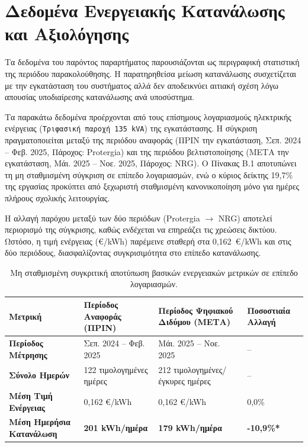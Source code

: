 \chapter{Δεδομένα Ενεργειακής Κατανάλωσης και Αξιολόγησης}

\noindent Τα δεδομένα του παρόντος παραρτήματος παρουσιάζονται ως περιγραφική στατιστική της περιόδου παρακολούθησης. Η παρατηρηθείσα μείωση κατανάλωσης συσχετίζεται με την εγκατάσταση του συστήματος αλλά δεν αποδεικνύει αιτιακή σχέση λόγω απουσίας υποδιαίρεσης κατανάλωσης ανά υποσύστημα.

Τα παρακάτω δεδομένα προέρχονται από τους επίσημους λογαριασμούς ηλεκτρικής ενέργειας (\texttt{Τριφασική παροχή 135 \textlatin{kVA}}) της εγκατάστασης. Η σύγκριση πραγματοποιείται μεταξύ της περιόδου αναφοράς (ΠΡΙΝ την εγκατάσταση, Σεπ. 2024 -- Φεβ. 2025, Πάροχος: \textlatin{Protergia}) και της περιόδου βελτιστοποίησης (ΜΕΤΑ την εγκατάσταση, Μάι. 2025 -- Νοε. 2025, Πάροχος: \textlatin{NRG}). Ο Πίνακας Β.1 αποτυπώνει τη μη σταθμισμένη σύγκριση σε επίπεδο λογαριασμών, ενώ ο κύριος δείκτης 19,7\% της εργασίας προκύπτει από ξεχωριστή σταθμισμένη κανονικοποίηση μόνο για ημέρες πλήρους σχολικής λειτουργίας.

Η αλλαγή παρόχου μεταξύ των δύο περιόδων (\textlatin{Protergia} $\rightarrow$ \textlatin{NRG}) αποτελεί περιορισμό της σύγκρισης, καθώς ενδέχεται να επηρεάζει τις χρεώσεις δικτύου. Ωστόσο, η τιμή ενέργειας (\euro/\textlatin{kWh}) παρέμεινε σταθερή στα 0,162~\euro/\textlatin{kWh} και στις δύο περιόδους, διασφαλίζοντας συγκρισιμότητα στο επίπεδο κατανάλωσης.

\begin{table}[htbp]
\centering
\caption{Μη σταθμισμένη συγκριτική αποτύπωση βασικών ενεργειακών μετρικών σε επίπεδο λογαριασμών.}
\label{tab:appendix_energy_summary}
\begin{tabular}{@{}p{4.4cm}p{4.2cm}p{4.6cm}p{3.2cm}@{}}
\toprule
\textbf{Μετρική} & \textbf{Περίοδος Αναφοράς (ΠΡΙΝ)} & \textbf{Περίοδος Ψηφιακού Διδύμου (ΜΕΤΑ)} & \textbf{Ποσοστιαία Αλλαγή} \\
\midrule
\textbf{Περίοδος Μέτρησης} & Σεπ. 2024 -- Φεβ. 2025 & Μάι. 2025 -- Νοε. 2025 & -- \\
\textbf{Σύνολο Ημερών} & 122 τιμολογημένες ημέρες & 212 τιμολογημένες/έγκυρες ημέρες & -- \\
\textbf{Μέση Τιμή Ενέργειας} & 0,162 \euro/\textlatin{kWh} & 0,162 \euro/\textlatin{kWh} & 0,0\% \\
\textbf{Μέση Ημερήσια Κατανάλωση} & \textbf{201 \textlatin{kWh}/ημέρα} & \textbf{179 \textlatin{kWh}/ημέρα} & \textbf{-10,9\%*} \\
\bottomrule
\end{tabular}
\end{table}

